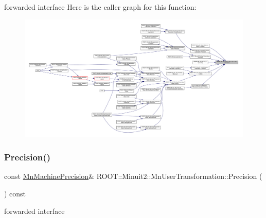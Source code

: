 forwarded interface Here is the caller graph for this function\+:\nopagebreak
\begin{figure}[H]
\begin{center}
\leavevmode
\includegraphics[width=350pt]{d9/d98/classROOT_1_1Minuit2_1_1MnUserTransformation_af9d893a428a4f4d94dfef1bdd3e9936e_icgraph}
\end{center}
\end{figure}
\mbox{\label{classROOT_1_1Minuit2_1_1MnUserTransformation_af9d893a428a4f4d94dfef1bdd3e9936e}} 
\subsubsection{\texorpdfstring{Precision()}{Precision()}\hspace{0.1cm}{\footnotesize\ttfamily [2/2]}}
{\footnotesize\ttfamily const \mbox{\hyperlink{classROOT_1_1Minuit2_1_1MnMachinePrecision}{Mn\+Machine\+Precision}}\& R\+O\+O\+T\+::\+Minuit2\+::\+Mn\+User\+Transformation\+::\+Precision (\begin{DoxyParamCaption}{ }\end{DoxyParamCaption}) const\hspace{0.3cm}{\ttfamily [inline]}}

forwarded interface \mbox{\label{classROOT_1_1Minuit2_1_1MnUserTransformation_acc0c7437f21dc53d1d56d62f7a82d352}} 
